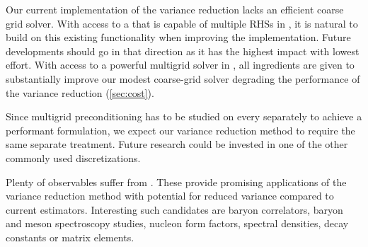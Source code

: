 Our current implementation of the variance reduction lacks an efficient coarse grid solver.
With access to a  that is capable of multiple RHSs in \quda, it is natural to build on this existing functionality when improving the implementation.
Future developments should go in that direction as it has the highest impact with lowest effort.
With access to a powerful multigrid solver in \quda, all ingredients are given to substantially improve our modest coarse-grid solver degrading the performance of the variance reduction (\cref{sec:cost}).


Since multigrid preconditioning has to be studied on every  separately to achieve a performant formulation, we expect our variance reduction method to require the same separate treatment.
Future research could be invested in one of the other commonly used discretizations.

Plenty of observables suffer from .
These provide promising applications of the variance reduction method with potential for reduced variance compared to current estimators.
Interesting such candidates are baryon correlators, baryon and meson spectroscopy studies, nucleon form factors, spectral densities, decay constants or matrix elements.






